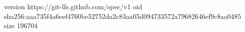 version https://git-lfs.github.com/spec/v1
oid sha256:aaa735f4a6eef4760be52752da2c83aa05d094733572a79682646ef9c8aa0485
size 196704
